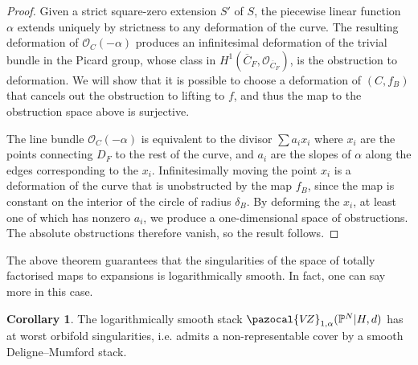\documentclass[11pt]{amsart}
\newcommand{\VZ}{\pazocal{V\!Z}}
\renewcommand{\to}{\rightarrow}
\theoremstyle{definition}
\newtheorem{cor}[thm]{Corollary}
\theoremstyle{definition}
\begin{document}
\begin{proof}
Given a strict square-zero extension $S'$ of $S$, the piecewise linear function $\alpha$ extends uniquely by strictness to any deformation of the curve. The resulting deformation of $\mathcal O_{C}(-\alpha)$ produces an infinitesimal deformation of the trivial bundle in the Picard group, whose class in $H^1(\overline{C}_F,\mathcal O_{\overline{C}_F})$, is the obstruction to deformation. We will show that it is possible to choose a deformation of $(C,f_B)$ that cancels out the obstruction to lifting to $f$, and thus the map to the obstruction space above is surjective. 

The line bundle $\mathcal O_{C}(-\alpha)$ is equivalent to the divisor $\sum a_i x_i$ where $x_i$ are the points connecting $D_F$ to the rest of the curve, and $a_i$ are the slopes of $\alpha$ along the edges corresponding to the $x_i$. Infinitesimally moving the point $x_i$ is a deformation of the curve that is unobstructed by the map $f_B$, since the map is constant on the interior of the circle of radius $\delta_B$. By deforming the $x_i$, at least one of which has nonzero $a_i$, we produce a one-dimensional space of obstructions. The absolute obstructions therefore vanish, so the result follows.  
\end{proof}

The above theorem guarantees that the singularities of the space of totally factorised maps to expansions is logarithmically smooth. In fact, one can say more in this case.

\begin{cor}
The logarithmically smooth stack $\VZ_{1,\alpha}(\mathbb P^N|H,d)$ has at worst orbifold singularities, i.e. admits a non-representable cover by a smooth Deligne--Mumford stack.
\end{cor}
\end{document}
